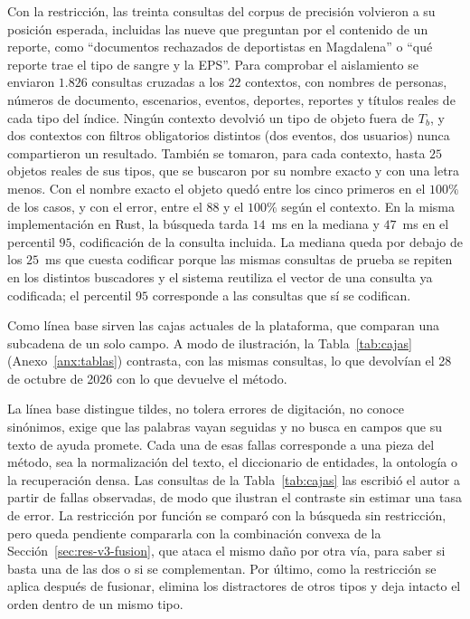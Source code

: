 \documentclass[11pt,letterpaper]{article}
\numberwithin{equation}{section}
\begin{document}
Con la restricción, las treinta consultas del corpus de precisión volvieron a su posición esperada, incluidas las nueve que preguntan por el contenido de un reporte, como ``documentos rechazados de deportistas en Magdalena'' o ``qué reporte trae el tipo de sangre y la EPS''. Para comprobar el aislamiento se enviaron $1.826$ consultas cruzadas a los $22$ contextos, con nombres de personas, números de documento, escenarios, eventos, deportes, reportes y títulos reales de cada tipo del índice. Ningún contexto devolvió un tipo de objeto fuera de $T_b$, y dos contextos con filtros obligatorios distintos (dos eventos, dos usuarios) nunca compartieron un resultado. También se tomaron, para cada contexto, hasta $25$ objetos reales de sus tipos, que se buscaron por su nombre exacto y con una letra menos. Con el nombre exacto el objeto quedó entre los cinco primeros en el $100\%$ de los casos, y con el error, entre el $88$ y el $100\%$ según el contexto. En la misma implementación en Rust, la búsqueda tarda $14$~ms en la mediana y $47$~ms en el percentil $95$, codificación de la consulta incluida. La mediana queda por debajo de los $25$~ms que cuesta codificar porque las mismas consultas de prueba se repiten en los distintos buscadores y el sistema reutiliza el vector de una consulta ya codificada; el percentil $95$ corresponde a las consultas que sí se codifican.

Como línea base sirven las cajas actuales de la plataforma, que comparan una subcadena de un solo campo. A modo de ilustración, la Tabla~\ref{tab:cajas} (Anexo~\ref{anx:tablas}) contrasta, con las mismas consultas, lo que devolvían el 28 de octubre de 2026 con lo que devuelve el método.


La línea base distingue tildes, no tolera errores de digitación, no conoce sinónimos, exige que las palabras vayan seguidas y no busca en campos que su texto de ayuda promete. Cada una de esas fallas corresponde a una pieza del método, sea la normalización del texto, el diccionario de entidades, la ontología o la recuperación densa. Las consultas de la Tabla~\ref{tab:cajas} las escribió el autor a partir de fallas observadas, de modo que ilustran el contraste sin estimar una tasa de error. La restricción por función se comparó con la búsqueda sin restricción, pero queda pendiente compararla con la combinación convexa de la Sección~\ref{sec:res-v3-fusion}, que ataca el mismo daño por otra vía, para saber si basta una de las dos o si se complementan. Por último, como la restricción se aplica después de fusionar, elimina los distractores de otros tipos y deja intacto el orden dentro de un mismo tipo.
\end{document}
